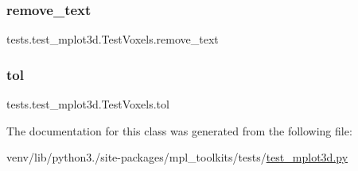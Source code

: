 \subsubsection{\texorpdfstring{remove\+\_\+text}{remove\_text}}
{\footnotesize\ttfamily tests.\+test\+\_\+mplot3d.\+Test\+Voxels.\+remove\+\_\+text\hspace{0.3cm}{\ttfamily [static]}}

\mbox{\label{classtests_1_1test__mplot3d_1_1TestVoxels_aec9c312ccfdcbb336bfbab0b7dda1d6d}} 
\subsubsection{\texorpdfstring{tol}{tol}}
{\footnotesize\ttfamily tests.\+test\+\_\+mplot3d.\+Test\+Voxels.\+tol\hspace{0.3cm}{\ttfamily [static]}}



The documentation for this class was generated from the following file\+:\begin{DoxyCompactItemize}
\item 
venv/lib/python3./site-\/packages/mpl\+\_\+toolkits/tests/\hyperlink{test__mplot3d_8py}{test\+\_\+mplot3d.\+py}\end{DoxyCompactItemize}
